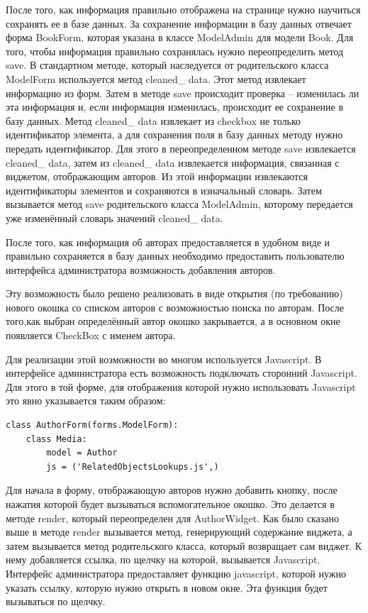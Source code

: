 \documentclass[a4paper]{report}
\begin{document}
После того, как информация правильно отображена на странице нужно научиться сохранять ее в базе данных. За сохранение  информации в базу данных отвечает форма BookForm, которая указана в классе ModelAdmin для модели Book. Для того, чтобы информация правильно сохранялась нужно переопределить метод save. В стандартном методе, который наследуется от родительского класса ModelForm используется метод cleaned\_ data. Этот метод извлекает информацию из форм. Затем в методе save происходит проверка -- изменилась ли эта информация и, если информация изменилась, происходит ее сохранение в базу данных. Метод cleaned\_ data извлекает из checkbox не только идентификатор элемента, а для сохранения поля в базу данных методу нужно передать идентификатор. Для этого в переопределенном методе save извлекается cleaned\_ data, затем из cleaned\_ data извлекается информация, связанная с виджетом, отображающим авторов. Из этой информации извлекаются идентификаторы элементов и сохраняются в изначальный словарь. Затем вызывается метод save родительского класса ModelAdmin, которому передается уже изменённый словарь значений cleaned\_ data. 

После того, как информация об авторах предоставляется в удобном виде и правильно сохраняется в базу данных необходимо предоставить пользователю интерфейса администратора возможность добавления авторов. 

Эту возможность было решено реализовать в виде открытия (по требованию) нового окошка со списком авторов с возможностью поиска по авторам. После того,как выбран определённый автор окошко закрывается, а в основном окне появляется CheckBox с именем автора. 

Для реализации этой возможности во многом используется Javascript. В интерфейсе администратора есть возможность подключать сторонний Javascript. Для этого в той форме, для отображения которой нужно использовать Javascript это явно указывается таким образом:

\begin{verbatim}
class AuthorForm(forms.ModelForm):
    class Media:
    	model = Author
        js = ('RelatedObjectsLookups.js',)

\end{verbatim}

Для начала в форму, отображающую авторов нужно добавить кнопку, после нажатия которой будет вызываться вспомогательное окошко. Это делается в методе render, который переопределен для AuthorWidget. Как было сказано выше в методе render вызывается метод, генерирующий содержание виджета, а затем вызывается метод родительского класса, который возвращает сам виджет. К нему добавляется ссылка, по щелчку на которой, вызывается Javascript. Интерфейс администратора предоставляет функцию javascript, которой нужно указать ссылку, которую нужно открыть в новом окне. Эта функция будет вызываться по щелчку. 
\end{document}
